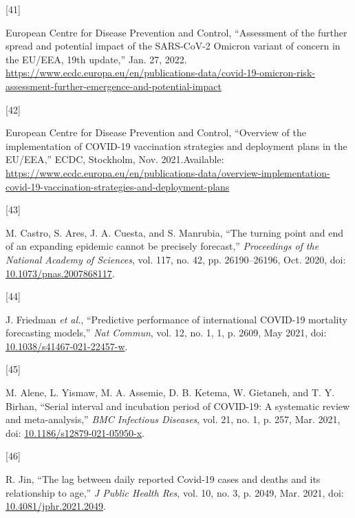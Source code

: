 \documentclass[
]{article}
\newlength{\cslhangindent}
\newlength{\csllabelwidth}
\newlength{\cslentryspacingunit} %
\newenvironment{CSLReferences}[2] %
 {%
  \setlength{\parindent}{0pt}
  \ifodd #1
  \let\oldpar\par
  \def\par{\hangindent=\cslhangindent\oldpar}
  \fi
  \setlength{\parskip}{#2\cslentryspacingunit}
 }%
 {}
\newcommand{\CSLLeftMargin}[1]{\parbox[t]{\csllabelwidth}{#1}}
\newcommand{\CSLRightInline}[1]{\parbox[t]{\linewidth - \csllabelwidth}{#1}\break}
\begin{document}
\begin{CSLReferences}{0}{0}
\leavevmode{}%
\CSLLeftMargin{{[}41{]} }
\CSLRightInline{European Centre for Disease Prevention and Control, {``Assessment of the further spread and potential impact of the {SARS-CoV-2 Omicron} variant of concern in the {EU}/{EEA}, 19th update,''} Jan. 27, 2022. \url{https://www.ecdc.europa.eu/en/publications-data/covid-19-omicron-risk-assessment-further-emergence-and-potential-impact}}

\leavevmode{}%
\CSLLeftMargin{{[}42{]} }
\CSLRightInline{European Centre for Disease Prevention and Control, {``Overview of the implementation of {COVID-19} vaccination strategies and deployment plans in the {EU}/{EEA},''} {ECDC}, {Stockholm}, Nov. 2021.Available: \url{https://www.ecdc.europa.eu/en/publications-data/overview-implementation-covid-19-vaccination-strategies-and-deployment-plans}}

\leavevmode{}%
\CSLLeftMargin{{[}43{]} }
\CSLRightInline{M. Castro, S. Ares, J. A. Cuesta, and S. Manrubia, {``The turning point and end of an expanding epidemic cannot be precisely forecast,''} \emph{Proceedings of the National Academy of Sciences}, vol. 117, no. 42, pp. 26190--26196, Oct. 2020, doi: \href{https://doi.org/10.1073/pnas.2007868117}{10.1073/pnas.2007868117}.}

\leavevmode{}%
\CSLLeftMargin{{[}44{]} }
\CSLRightInline{J. Friedman \emph{et al.}, {``Predictive performance of international {COVID-19} mortality forecasting models,''} \emph{Nat Commun}, vol. 12, no. 1, 1, p. 2609, May 2021, doi: \href{https://doi.org/10.1038/s41467-021-22457-w}{10.1038/s41467-021-22457-w}.}

\leavevmode{}%
\CSLLeftMargin{{[}45{]} }
\CSLRightInline{M. Alene, L. Yismaw, M. A. Assemie, D. B. Ketema, W. Gietaneh, and T. Y. Birhan, {``Serial interval and incubation period of {COVID-19}: A systematic review and meta-analysis,''} \emph{BMC Infectious Diseases}, vol. 21, no. 1, p. 257, Mar. 2021, doi: \href{https://doi.org/10.1186/s12879-021-05950-x}{10.1186/s12879-021-05950-x}.}

\leavevmode{}%
\CSLLeftMargin{{[}46{]} }
\CSLRightInline{R. Jin, {``The lag between daily reported {Covid-19} cases and deaths and its relationship to age,''} \emph{J Public Health Res}, vol. 10, no. 3, p. 2049, Mar. 2021, doi: \href{https://doi.org/10.4081/jphr.2021.2049}{10.4081/jphr.2021.2049}.}


\end{CSLReferences}
\end{document}
